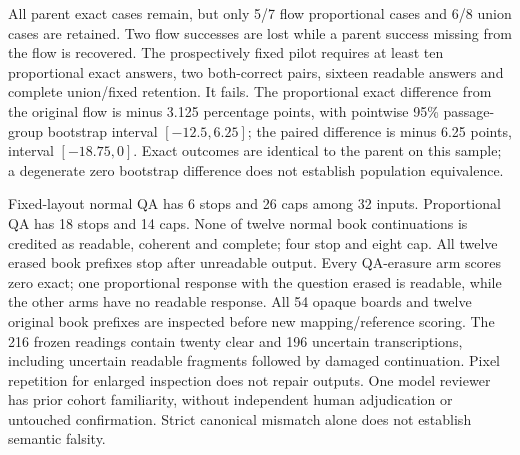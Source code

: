 All parent exact cases remain, but only 5/7 flow proportional cases and 6/8
union cases are retained. Two flow successes are lost while a parent success
missing from the flow is recovered. The prospectively fixed pilot requires
at least ten proportional exact answers, two both-correct pairs, sixteen
readable answers and complete union/fixed retention. It fails. The
proportional exact difference from the original flow is minus 3.125 percentage
points, with pointwise 95\% passage-group bootstrap interval $[-12.5,6.25]$;
the paired difference is minus 6.25 points, interval $[-18.75,0]$. Exact
outcomes are identical to the parent on this sample; a degenerate zero
bootstrap difference does not establish population equivalence.

Fixed-layout normal QA has 6 stops and 26 caps among 32 inputs. Proportional
QA has 18 stops and 14 caps. None of twelve
normal book continuations is credited as readable, coherent and complete;
four stop and eight cap. All twelve erased book prefixes stop after unreadable
output. Every QA-erasure arm scores zero exact; one proportional response
with the question erased is readable, while the other arms have no readable response.
All 54 opaque boards and twelve original book prefixes are inspected before
new mapping/reference scoring. The 216 frozen readings contain twenty clear
and 196 uncertain transcriptions, including uncertain readable fragments
followed by damaged continuation. Pixel repetition for enlarged inspection
does not repair outputs. One model reviewer has prior cohort familiarity,
without independent human adjudication or untouched confirmation. Strict
canonical mismatch alone does not establish semantic falsity.

